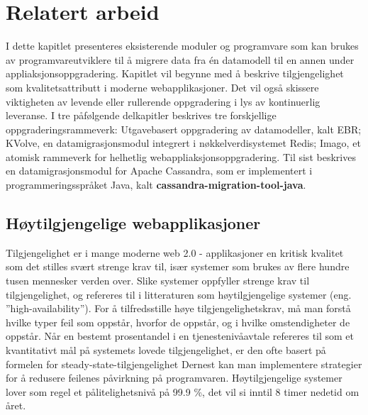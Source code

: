 
\chapter{Relatert arbeid}

I dette kapitlet presenteres eksisterende moduler og programvare som kan brukes av programvareutviklere til å migrere data fra én datamodell til en annen under appliaksjonsoppgradering. Kapitlet vil begynne med å beskrive tilgjengelighet som kvalitetsattributt i moderne webapplikasjoner. Det vil også skissere viktigheten av  levende eller rullerende oppgradering i lys av kontinuerlig leveranse. I tre påfølgende delkapitler beskrives tre forskjellige oppgraderingsrammeverk: Utgavebasert oppgradering av datamodeller, kalt EBR; KVolve, en datamigrasjonsmodul integrert i nøkkelverdisystemet Redis; Imago, et atomisk rammeverk for helhetlig webappliaksjonsoppgradering. Til sist beskrives en datamigrasjonsmodul for Apache Cassandra, som er implementert i programmeringsspråket Java, kalt \textbf{cassandra-migration-tool-java}.

\section{Høytilgjengelige webapplikasjoner}

Tilgjengelighet er i mange moderne web 2.0 - applikasjoner en kritisk kvalitet som det stilles svært strenge krav til, især systemer som brukes av flere hundre tusen mennesker verden over. Slike systemer oppfyller strenge krav til tilgjengelighet, og refereres til i litteraturen som høytilgjengelige systemer (eng. ''high-availability''). For å tilfredsstille høye tilgjengelighetskrav, må man forstå hvilke typer feil som oppstår, hvorfor de oppstår, og i hvilke omstendigheter de oppstår. Når en bestemt prosentandel i en tjenestenivåavtale refereres til som et kvantitativt mål på systemets lovede tilgjengelighet, er den ofte basert på formelen for steady-state-tilgjengelighet  Dernest kan man implementere strategier for å redusere feilenes påvirkning på programvaren. Høytilgjengelige systemer lover som regel et pålitelighetsnivå på 99.9 \%, det vil si inntil 8 timer nedetid om året.








\cleardoublepage